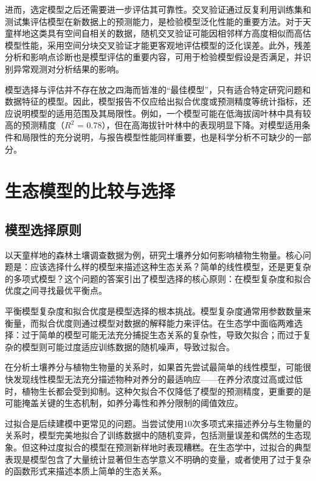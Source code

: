 \documentclass[
  twoside,12pt,fontset=none]{ctexbook}
\begin{document}
进而，选定模型之后还需要进一步评估其可靠性。交叉验证通过反复利用训练集和测试集评估模型在新数据上的预测能力，是检验模型泛化性能的重要方法。对于天童样地这类具有空间自相关的数据，随机交叉验证可能因相邻样方高度相似而高估模型性能，采用空间分块交叉验证才能更客观地评估模型的泛化误差。此外，残差分析和影响点诊断也是模型评估的重要内容，可用于检验模型假设是否满足，并识别异常观测对分析结果的影响。

模型选择与评估并不存在放之四海而皆准的``最佳模型''，只有适合特定研究问题和数据特征的模型。因此，模型报告不仅应给出拟合优度或预测精度等统计指标，还应说明模型的适用范围及其局限性。例如，一个模型可能在低海拔阔叶林中具有较高的预测精度（\(R^2\) = 0.78），但在高海拔针叶林中的表现明显下降。对模型适用条件和局限性的充分说明，与报告模型性能同样重要，也是科学分析不可缺少的一部分。

\hypertarget{ux751fux6001ux6a21ux578bux7684ux6bd4ux8f83ux4e0eux9009ux62e9}{%
\section{生态模型的比较与选择}\label{ux751fux6001ux6a21ux578bux7684ux6bd4ux8f83ux4e0eux9009ux62e9}}

\hypertarget{ux6a21ux578bux9009ux62e9ux539fux5219}{%
\subsection{模型选择原则}\label{ux6a21ux578bux9009ux62e9ux539fux5219}}

以天童样地的森林土壤调查数据为例，研究土壤养分如何影响植物生物量。核心问题是：应该选择什么样的模型来描述这种生态关系？简单的线性模型，还是更复杂的多项式模型？这个问题的答案引出了模型选择的核心原则：在模型复杂度和拟合优度之间寻找最优平衡点。

平衡模型复杂度和拟合优度是模型选择的根本挑战。模型复杂度通常用参数数量来衡量，而拟合优度则通过模型对数据的解释能力来评估。在生态学中面临两难选择：过于简单的模型可能无法充分捕捉生态关系的复杂性，导致欠拟合；而过于复杂的模型则可能过度适应训练数据的随机噪声，导致过拟合。

在分析土壤养分与植物生物量的关系时，如果首先尝试最简单的线性模型，可能很快发现线性模型无法充分描述物种对养分的最适响应------在养分浓度过高或过低时，植物生长都会受到抑制。这种欠拟合不仅降低了模型的预测精度，更重要的是可能掩盖关键的生态机制，如养分毒性和养分限制的阈值效应。

过拟合是后续建模中更常见的问题。当尝试使用10次多项式来描述养分与生物量的关系时，模型完美地拟合了训练数据中的随机变异，包括测量误差和偶然的生态现象。但这种过度拟合的模型在预测新样地时表现糟糕。在生态学中，过拟合的典型表现是模型包含了大量统计显著但生态学意义不明确的变量，或者使用了过于复杂的函数形式来描述本质上简单的生态关系。
\end{document}
